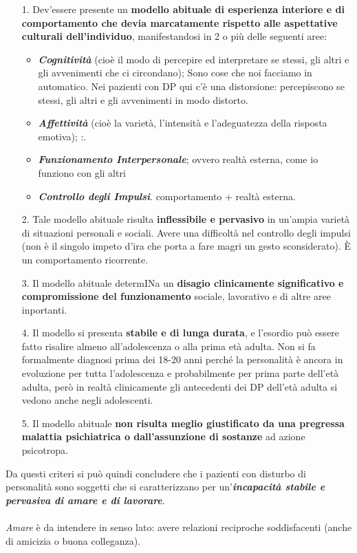\begin{itemize}
\item[1.]
  Dev'essere presente un \textbf{modello abituale di esperienza
  interiore e di comportamento che devia marcatamente rispetto alle
  aspettative culturali dell'individuo}, manifestandosi in 2 o più delle
  seguenti aree:
  \begin{itemize}
\item
  \textbf{\emph{Cognitività}} (cioè il modo di percepire ed interpretare
  se stessi, gli altri e gli avvenimenti che ci circondano); Sono cose
  che noi facciamo in automatico. Nei pazienti con DP qui c'è una
  distorsione: percepiscono se stessi, gli altri e gli avvenimenti in
  modo distorto.
\item
  \textbf{\emph{Affettività}} (cioè la varietà, l'intensità e
  l'adeguatezza della risposta emotiva); :.
\item
  \textbf{\emph{Funzionamento Interpersonale}}; ovvero realtà esterna,
  come io funziono con gli altri
\item
  \textbf{\emph{Controllo degli Impulsi}}. comportamento + realtà
  esterna.
\end{itemize}
\item[2.]
  Tale modello abituale risulta \textbf{inflessibile e pervasivo} in
  un'ampia varietà di situazioni personali e sociali. Avere una
  difficoltà nel controllo degli impulsi (non è il singolo impeto d'ira
  che porta a fare magri un gesto sconsiderato). È un comportamento
  ricorrente.
\item[3.]
  Il modello abituale determINa un \textbf{disagio clinicamente
  significativo e compromissione del funzionamento} sociale, lavorativo
  e di altre aree inportanti.
\item[4.]
  Il modello si presenta \textbf{stabile e di lunga durata}, e l'esordio
  può essere fatto risalire almeno all'adolescenza o alla prima età
  adulta. Non si fa formalmente diagnosi prima dei 18-20 anni perché la
  personalità è ancora in evoluzione per tutta l'adolescenza e
  probabilmente per prima parte dell'età adulta, però in realtà
  clinicamente gli antecedenti dei DP dell'età adulta si vedono anche
  negli adolescenti.
\item[5.]
  Il modello abituale \textbf{non risulta meglio giustificato da una
  pregressa malattia psichiatrica o dall'assunzione di sostanze} ad
  azione psicotropa.
\end{itemize}

Da questi criteri si può quindi concludere che i pazienti con disturbo
di personalità sono soggetti che si caratterizzano per
un'\textbf{\emph{incapacità stabile e pervasiva di amare e di
lavorare}}.
\\\\
\emph{Amare} è da intendere in senso lato: avere relazioni reciproche
soddisfacenti (anche di amicizia o buona colleganza).

